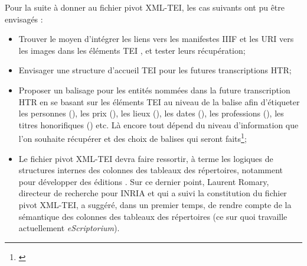 Pour la suite à donner au fichier pivot XML-TEI, les cas suivants ont pu être envisagés :
\begin{itemize}
    \item Trouver le moyen d'intégrer les liens vers les manifestes IIIF et les URI vers les images dans les éléments TEI , et tester leurs récupération;\\
    \item Envisager une structure d'accueil TEI pour les futures transcriptions HTR;\\
    \item Proposer un balisage pour les entités nommées dans la future transcription HTR en se basant sur les éléments TEI au niveau de la balise  afin d'étiqueter les personnes (), les prix (), les lieux (), les dates (), les professions (), les titres honorifiques () etc. Là encore tout dépend du niveau d'information que l'on souhaite récupérer et des choix de balises qui seront faits\footnote{\cite{le_pevedic_retour_2016}};\\
    \item Le fichier pivot XML-TEI devra faire ressortir, à terme les logiques de structures internes des colonnes des tableaux des répertoires, notamment pour développer des éditions . Sur ce dernier point, Laurent Romary, directeur de recherche pour INRIA et qui a suivi la constitution du fichier pivot XML-TEI, a suggéré, dans un premier temps, de rendre compte de la sémantique des colonnes des tableaux des répertoires (ce sur quoi travaille actuellement \textit{eScriptorium}). 
    

\end{itemize}

